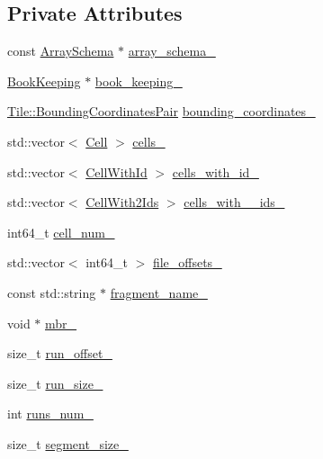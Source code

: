 \subsection*{Private Attributes}
\begin{DoxyCompactItemize}
\item 
const \hyperlink{classArraySchema}{Array\+Schema} $\ast$ \hyperlink{classWriteState_a0850e4d612b288d0a27003985f48f1f8}{array\+\_\+schema\+\_\+}
\item 
\hyperlink{classBookKeeping}{Book\+Keeping} $\ast$ \hyperlink{classWriteState_a228d18fbe2760193bc672aeae009a31d}{book\+\_\+keeping\+\_\+}
\item 
\hyperlink{classTile_a7103069b7ba05d1032733e3a026b8632}{Tile\+::\+Bounding\+Coordinates\+Pair} \hyperlink{classWriteState_a50b41a53268ae74bec6e24695624f9d0}{bounding\+\_\+coordinates\+\_\+}
\item 
std\+::vector$<$ \hyperlink{structWriteState_1_1Cell}{Cell} $>$ \hyperlink{classWriteState_a90d90b4abfd9e35f1726842617122558}{cells\+\_\+}
\item 
std\+::vector$<$ \hyperlink{structWriteState_1_1CellWithId}{Cell\+With\+Id} $>$ \hyperlink{classWriteState_a296e22c27c0c1965771670d3bdd2dfd5}{cells\+\_\+with\+\_\+id\+\_\+}
\item 
std\+::vector$<$ \hyperlink{structWriteState_1_1CellWith2Ids}{Cell\+With2\+Ids} $>$ \hyperlink{classWriteState_a1b14e06c30ce9617b2f1a16263b1a134}{cells\+\_\+with\+\_\+\_\+ids\+\_\+}
\item 
int64\+\_\+t \hyperlink{classWriteState_a059d757cb8fbc5bb7bfff6e1f5ea7f79}{cell\+\_\+num\+\_\+}
\item 
std\+::vector$<$ int64\+\_\+t $>$ \hyperlink{classWriteState_a94e403575a527bf5b592cd56b37312a9}{file\+\_\+offsets\+\_\+}
\item 
const std\+::string $\ast$ \hyperlink{classWriteState_ad9ac14c7c723928f987d737aee0e0603}{fragment\+\_\+name\+\_\+}
\item 
void $\ast$ \hyperlink{classWriteState_a263affe5c47bb910058cda181facd393}{mbr\+\_\+}
\item 
size\+\_\+t \hyperlink{classWriteState_aa81ec074dba266202c72f1dc5b34d28a}{run\+\_\+offset\+\_\+}
\item 
size\+\_\+t \hyperlink{classWriteState_a77bff60be493ad28638135d43f4929c5}{run\+\_\+size\+\_\+}
\item 
int \hyperlink{classWriteState_a6c1e55b3b77f064ada008f83f61ceb51}{runs\+\_\+num\+\_\+}
\item 
size\+\_\+t \hyperlink{classWriteState_a16f11023373160d16b4f7d55d28ec3ac}{segment\+\_\+size\+\_\+}

\end{DoxyCompactItemize}
